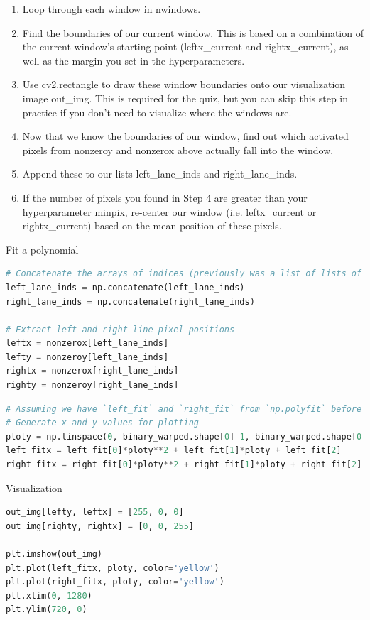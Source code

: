 \documentclass[12pt]{article}
\begin{document}
\begin{enumerate}
    \item Loop through each window in nwindows.
    \item Find the boundaries of our current window. This is based on a combination of the current window's starting point (leftx\_current and rightx\_current), as well as the margin you set in the hyperparameters.
    \item Use cv2.rectangle to draw these window boundaries onto our visualization image out\_img. This is required for the quiz, but you can skip this step in practice if you don't need to visualize where the windows are.
    \item Now that we know the boundaries of our window, find out which activated pixels from nonzeroy and nonzerox above actually fall into the window.
    \item Append these to our lists left\_lane\_inds and right\_lane\_inds.
    \item If the number of pixels you found in Step 4 are greater than your hyperparameter minpix, re-center our window (i.e. leftx\_current or rightx\_current) based on the mean position of these pixels.
\end{enumerate}

Fit a polynomial

\begin{lstlisting}[language=Python]
# Concatenate the arrays of indices (previously was a list of lists of pixels)
left_lane_inds = np.concatenate(left_lane_inds)
right_lane_inds = np.concatenate(right_lane_inds)

# Extract left and right line pixel positions
leftx = nonzerox[left_lane_inds]
lefty = nonzeroy[left_lane_inds] 
rightx = nonzerox[right_lane_inds]
righty = nonzeroy[right_lane_inds]
\end{lstlisting}

\begin{lstlisting}[language=Python]
# Assuming we have `left_fit` and `right_fit` from `np.polyfit` before
# Generate x and y values for plotting
ploty = np.linspace(0, binary_warped.shape[0]-1, binary_warped.shape[0])
left_fitx = left_fit[0]*ploty**2 + left_fit[1]*ploty + left_fit[2]
right_fitx = right_fit[0]*ploty**2 + right_fit[1]*ploty + right_fit[2]
\end{lstlisting}

Visualization

\begin{lstlisting}[language=Python]
out_img[lefty, leftx] = [255, 0, 0]
out_img[righty, rightx] = [0, 0, 255]

plt.imshow(out_img)
plt.plot(left_fitx, ploty, color='yellow')
plt.plot(right_fitx, ploty, color='yellow')
plt.xlim(0, 1280)
plt.ylim(720, 0)
\end{lstlisting}
\end{document}
